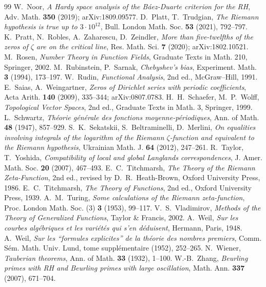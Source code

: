 \begin{thebibliography}{99}
 W.~Noor, \emph{A Hardy space analysis of the Báez-Duarte criterion for the RH}, Adv. Math. \textbf{350} (2019); arXiv:1809.09577.
 D.~Platt, T.~Trudgian, \emph{The Riemann hypothesis is true up to $3\cdot10^{12}$}, Bull. London Math. Soc. \textbf{53} (2021), 792--797.
 K.~Pratt, N.~Robles, A.~Zaharescu, D.~Zeindler, \emph{More than five-twelfths of the zeros of $\zeta$ are on the critical line}, Res. Math. Sci. \textbf{7} (2020); arXiv:1802.10521.
 M.~Rosen, \emph{Number Theory in Function Fields}, Graduate Texts in Math. 210, Springer, 2002.
 M.~Rubinstein, P.~Sarnak, \emph{Chebyshev's bias}, Experiment. Math. \textbf{3} (1994), 173--197.
 W.~Rudin, \emph{Functional Analysis}, 2nd ed., McGraw--Hill, 1991.
 E.~Saias, A.~Weingartner, \emph{Zeros of Dirichlet series with periodic coefficients}, Acta Arith. \textbf{140} (2009), 335--344; arXiv:0807.0783.
 H.~H.~Schaefer, M.~P.~Wolff, \emph{Topological Vector Spaces}, 2nd ed., Graduate Texts in Math. 3, Springer, 1999.
 L.~Schwartz, \emph{Théorie générale des fonctions moyenne-périodiques}, Ann. of Math. \textbf{48} (1947), 857--929.
 S.~K.~Sekatskii, S.~Beltraminelli, D.~Merlini, \emph{On equalities involving integrals of the logarithm of the Riemann $\zeta$-function and equivalent to the Riemann hypothesis}, Ukrainian Math. J. \textbf{64} (2012), 247--261.
 R.~Taylor, T.~Yoshida, \emph{Compatibility of local and global Langlands correspondences}, J. Amer. Math. Soc. \textbf{20} (2007), 467--493.
 E.~C.~Titchmarsh, \emph{The Theory of the Riemann Zeta-Function}, 2nd ed., revised by D.~R.~Heath-Brown, Oxford University Press, 1986.
 E.~C.~Titchmarsh, \emph{The Theory of Functions}, 2nd ed., Oxford University Press, 1939.
 A.~M.~Turing, \emph{Some calculations of the Riemann zeta-function}, Proc. London Math. Soc. (3) \textbf{3} (1953), 99--117.
 V.~S.~Vladimirov, \emph{Methods of the Theory of Generalized Functions}, Taylor \& Francis, 2002.
 A.~Weil, \emph{Sur les courbes algébriques et les variétés qui s'en déduisent}, Hermann, Paris, 1948.
 A.~Weil, \emph{Sur les ``formules explicites'' de la théorie des nombres premiers}, Comm. Sém. Math. Univ. Lund, tome supplémentaire (1952), 252--265.
 N.~Wiener, \emph{Tauberian theorems}, Ann. of Math. \textbf{33} (1932), 1--100.
 W.-B.~Zhang, \emph{Beurling primes with RH and Beurling primes with large oscillation}, Math. Ann. \textbf{337} (2007), 671--704.
\end{thebibliography}

